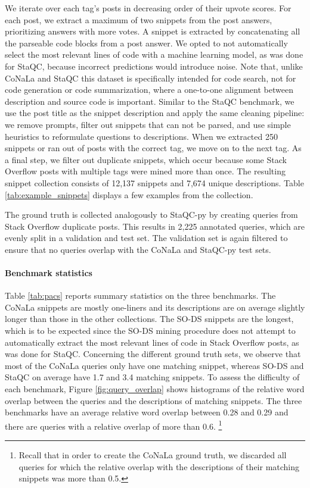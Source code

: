 \documentclass[12pt,conference, onecolumn]{IEEEtran}
\begin{document}
We iterate over each tag's posts in decreasing order of their upvote scores. For each post, we  extract a maximum of two snippets from the post answers, prioritizing answers with more votes. A snippet is extracted by concatenating all the parseable code blocks from a post answer. We opted to not automatically select the most relevant lines of code with a machine learning model, as was done for StaQC, because incorrect predictions would introduce noise. Note that, unlike CoNaLa and StaQC this dataset is specifically intended for code search, not for code generation or code summarization, where a one-to-one alignment between description and source code is important. Similar to the StaQC benchmark, we use the post title as the snippet description and apply the same cleaning pipeline: we remove prompts, filter out snippets that can not be parsed, and use simple heuristics to reformulate questions to descriptions. When we extracted 250 snippets or ran out of posts with the correct tag, we move on to the next tag.  As a final step, we filter out duplicate snippets, which occur because some Stack Overflow posts with multiple tags were mined more than once. The resulting snippet collection consists of 12,137 snippets and 7,674 unique descriptions.  Table \ref{tab:example_snippets} displays a few examples from the collection. 

The ground truth is collected analogously to StaQC-py by creating queries from Stack Overflow duplicate posts. This results in 2,225 annotated queries, which are evenly split in a validation and test set. The validation set is again filtered to ensure that no queries overlap with the CoNaLa and StaQC-py test sets.

\paragraph{Benchmark statistics}
Table \ref{tab:pacs} reports summary statistics on the three benchmarks. The CoNaLa snippets are mostly one-liners and its descriptions are on average slightly longer than those in the other collections. The SO-DS snippets are the longest, which is to be expected since the SO-DS mining procedure does not attempt to automatically extract the most relevant lines of code in Stack Overflow posts, as was done for StaQC. Concerning the different ground truth sets, we observe that most of the CoNaLa queries only have one matching snippet, whereas SO-DS and StaQC on average have 1.7 and 3.4 matching snippets. To assess the difficulty of each benchmark, Figure \ref{fig:query_overlap} shows histograms of the relative word overlap between the queries and the descriptions of matching snippets. The three benchmarks have an average relative word overlap between 0.28 and 0.29 and there are queries with a relative overlap of more than 0.6. \footnote{Recall that in order to create the CoNaLa ground truth, we discarded all queries for which the relative overlap with the descriptions of their matching snippets was more than 0.5.}
\end{document}
